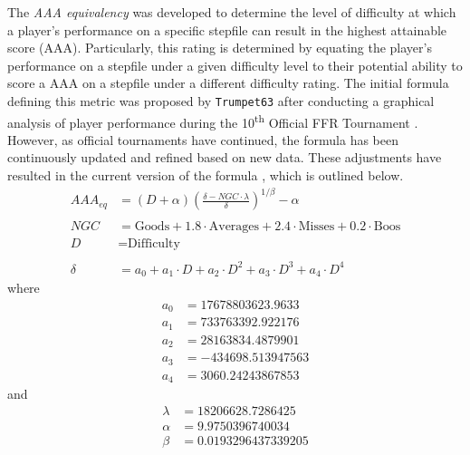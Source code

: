 The \textit{AAA equivalency} was developed to determine the level of difficulty at which a player's performance on a specific stepfile can result in the highest attainable score (AAA). Particularly, this rating is determined by equating the player's performance on a stepfile under a given difficulty level to their potential ability to score a AAA on a stepfile under a different difficulty rating. The initial formula defining this metric was proposed by \texttt{Trumpet63} after conducting a graphical analysis of player performance during the 10\textsuperscript{th} Official FFR Tournament \cite{20140930}. However, as official tournaments have continued, the formula has been continuously updated and refined based on new data. These adjustments have resulted in the current version of the formula \cite{20150216}, which is outlined below.
\begin{align*}
	AAA_{eq} & = (D + \alpha) \left( \frac{\delta - NGC \cdot \lambda}{\delta}\right)^{1 / \beta} - \alpha  \\
	\\
	NGC      & = \text{Goods} + 1.8 \cdot \text{Averages} + 2.4 \cdot \text{Misses} + 0.2 \cdot \text{Boos} \\
	D        & = \text{Difficulty}                                                                          \\
	\\
	\delta   & = a_0 + a_1 \cdot D + a_2 \cdot D^2 + a_3 \cdot D^3 + a_4 \cdot D^4
\end{align*}
where
\begin{align*}
	a_0      & = 17678803623.9633                                                                           \\
	a_1      & = 733763392.922176                                                                           \\
	a_2      & = 28163834.4879901                                                                           \\
	a_3      & = -434698.513947563                                                                          \\
	a_4      & = 3060.24243867853
\end{align*}
and
\begin{align*}
	\lambda  & = 18206628.7286425                                                                           \\
	\alpha   & = 9.9750396740034                                                                            \\
	\beta    & = 0.0193296437339205                                                                         
\end{align*}

